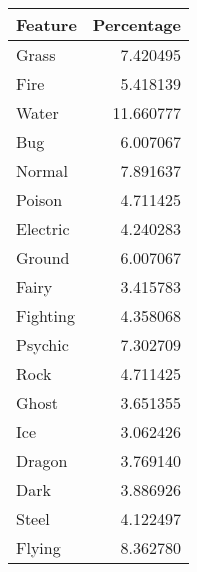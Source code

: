 \documentclass[border=1mm]{standalone}
\begin{document}
\begin{table}
\centering
\begin{tabular}[t]{l|r}
\hline
Feature & Percentage\\
\hline
Grass & 7.420495\\
\hline
Fire & 5.418139\\
\hline
Water & 11.660777\\
\hline
Bug & 6.007067\\
\hline
Normal & 7.891637\\
\hline
Poison & 4.711425\\
\hline
Electric & 4.240283\\
\hline
Ground & 6.007067\\
\hline
Fairy & 3.415783\\
\hline
Fighting & 4.358068\\
\hline
Psychic & 7.302709\\
\hline
Rock & 4.711425\\
\hline
Ghost & 3.651355\\
\hline
Ice & 3.062426\\
\hline
Dragon & 3.769140\\
\hline
Dark & 3.886926\\
\hline
Steel & 4.122497\\
\hline
Flying & 8.362780\\
\hline
\end{tabular}
\end{table}
\end{document}
